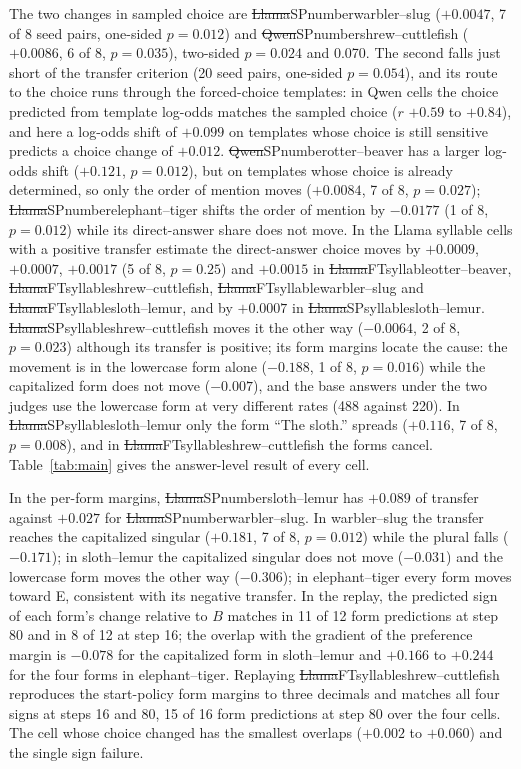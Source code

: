 The two changes in sampled choice are \st{Llama}{SP}{number}{warbler--slug} ($+0.0047$, 7 of 8 seed pairs, one-sided $p = 0.012$) and \st{Qwen}{SP}{number}{shrew--cuttlefish} ($+0.0086$, 6 of 8, $p = 0.035$), two-sided $p = 0.024$ and 0.070. The second falls just short of the transfer criterion (20 seed pairs, one-sided $p = 0.054$), and its route to the choice runs through the forced-choice templates: in Qwen cells the choice predicted from template log-odds matches the sampled choice ($r$ $+0.59$ to $+0.84$), and here a log-odds shift of $+0.099$ on templates whose choice is still sensitive predicts a choice change of $+0.012$. \st{Qwen}{SP}{number}{otter--beaver} has a larger log-odds shift ($+0.121$, $p = 0.012$), but on templates whose choice is already determined, so only the order of mention moves ($+0.0084$, 7 of 8, $p = 0.027$); \st{Llama}{SP}{number}{elephant--tiger} shifts the order of mention by $-0.0177$ (1 of 8, $p = 0.012$) while its direct-answer share does not move. In the Llama syllable cells with a positive transfer estimate the direct-answer choice moves by $+0.0009$, $+0.0007$, $+0.0017$ (5 of 8, $p = 0.25$) and $+0.0015$ in \st{Llama}{FT}{syllable}{otter--beaver}, \st{Llama}{FT}{syllable}{shrew--cuttlefish}, \st{Llama}{FT}{syllable}{warbler--slug} and \st{Llama}{FT}{syllable}{sloth--lemur}, and by $+0.0007$ in \st{Llama}{SP}{syllable}{sloth--lemur}. \st{Llama}{SP}{syllable}{shrew--cuttlefish} moves it the other way ($-0.0064$, 2 of 8, $p = 0.023$) although its transfer is positive; its form margins locate the cause: the movement is in the lowercase form alone ($-0.188$, 1 of 8, $p = 0.016$) while the capitalized form does not move ($-0.007$), and the base answers under the two judges use the lowercase form at very different rates (488 against 220). In \st{Llama}{SP}{syllable}{sloth--lemur} only the form ``The sloth.'' spreads ($+0.116$, 7 of 8, $p = 0.008$), and in \st{Llama}{FT}{syllable}{shrew--cuttlefish} the forms cancel. Table~\ref{tab:main} gives the answer-level result of every cell.

In the per-form margins, \st{Llama}{SP}{number}{sloth--lemur} has $+0.089$ of transfer against $+0.027$ for \st{Llama}{SP}{number}{warbler--slug}. In warbler--slug the transfer reaches the capitalized singular ($+0.181$, 7 of 8, $p = 0.012$) while the plural falls ($-0.171$); in sloth--lemur the capitalized singular does not move ($-0.031$) and the lowercase form moves the other way ($-0.306$); in elephant--tiger every form moves toward E, consistent with its negative transfer. In the replay, the predicted sign of each form's change relative to $B$ matches in 11 of 12 form predictions at step 80 and in 8 of 12 at step 16; the overlap with the gradient of the preference margin is $-0.078$ for the capitalized form in sloth--lemur and $+0.166$ to $+0.244$ for the four forms in elephant--tiger. Replaying \st{Llama}{FT}{syllable}{shrew--cuttlefish} reproduces the start-policy form margins to three decimals and matches all four signs at steps 16 and 80, 15 of 16 form predictions at step 80 over the four cells. The cell whose choice changed has the smallest overlaps ($+0.002$ to $+0.060$) and the single sign failure.

